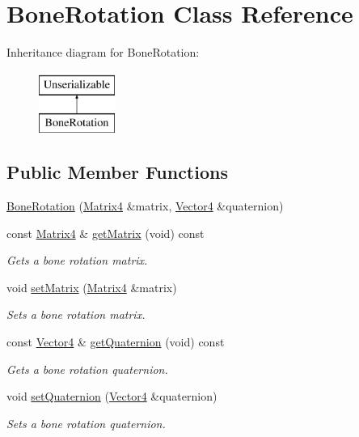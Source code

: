 \hypertarget{class_bone_rotation}{\section{\-Bone\-Rotation \-Class \-Reference}
\label{class_bone_rotation}
}
\-Inheritance diagram for \-Bone\-Rotation\-:\begin{figure}[H]
\begin{center}
\leavevmode
\includegraphics[height=2.000000cm]{class_bone_rotation}
\end{center}
\end{figure}
\subsection*{\-Public \-Member \-Functions}
\begin{DoxyCompactItemize}
\item 
\hyperlink{class_bone_rotation_aa9aa2b04d5be69e1a2953d57a07d2a39}{\-Bone\-Rotation} (\hyperlink{class_matrix4}{\-Matrix4} \&matrix, \hyperlink{class_vector4}{\-Vector4} \&quaternion)
\item 
const \hyperlink{class_matrix4}{\-Matrix4} \& \hyperlink{class_bone_rotation_a511c75443d388ec75d609ab75b3580b3}{get\-Matrix} (void) const 
\begin{DoxyCompactList}\small\item\em \-Gets a bone rotation matrix. \end{DoxyCompactList}\item 
void \hyperlink{class_bone_rotation_a61d37984c33366cb8b34cf9c2232a8b6}{set\-Matrix} (\hyperlink{class_matrix4}{\-Matrix4} \&matrix)
\begin{DoxyCompactList}\small\item\em \-Sets a bone rotation matrix. \end{DoxyCompactList}\item 
const \hyperlink{class_vector4}{\-Vector4} \& \hyperlink{class_bone_rotation_a6b540c5081efbe691260495517f0abba}{get\-Quaternion} (void) const 
\begin{DoxyCompactList}\small\item\em \-Gets a bone rotation quaternion. \end{DoxyCompactList}\item 
void \hyperlink{class_bone_rotation_a349413b470bf55a33c43875f181a0e61}{set\-Quaternion} (\hyperlink{class_vector4}{\-Vector4} \&quaternion)
\begin{DoxyCompactList}\small\item\em \-Sets a bone rotation quaternion. \end{DoxyCompactList}\end{DoxyCompactItemize}


